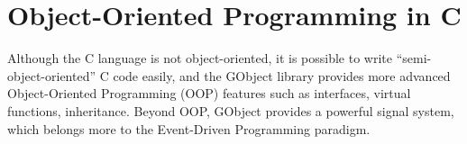 \chapter{Object-Oriented Programming in C}
\label{gobject}

Although the C language is not object-oriented, it is possible to write ``semi-object-oriented'' C code easily, and the GObject library provides more advanced Object-Oriented Programming (OOP) features such as interfaces, virtual functions, inheritance. Beyond OOP, GObject provides a powerful signal system, which belongs more to the Event-Driven Programming paradigm.
